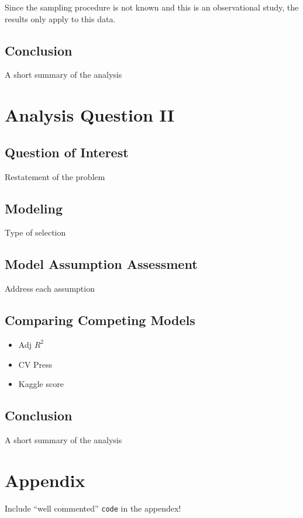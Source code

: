 \documentclass[american,]{article}
\providecommand{\tightlist}{%
  \setlength{\itemsep}{0pt}\setlength{\parskip}{0pt}}
\begin{document}
Since the sampling procedure is not known and this is an observational
study, the results only apply to this data.

\hypertarget{conclusion}{%
\subsection{Conclusion}\label{conclusion}}

A short summary of the analysis

\hypertarget{analysis-question-ii}{%
\section{Analysis Question II}\label{analysis-question-ii}}

\hypertarget{question-of-interest-1}{%
\subsection{Question of Interest}\label{question-of-interest-1}}

Restatement of the problem

\hypertarget{modeling-1}{%
\subsection{Modeling}\label{modeling-1}}

Type of selection

\hypertarget{model-assumption-assessment}{%
\subsection{Model Assumption
Assessment}\label{model-assumption-assessment}}

Address each assumption

\hypertarget{comparing-competing-models-1}{%
\subsection{Comparing Competing
Models}\label{comparing-competing-models-1}}

\begin{itemize}
\tightlist
\item
  Adj \(R^2\)
\item
  CV Press
\item
  Kaggle score
\end{itemize}

\hypertarget{conclusion-1}{%
\subsection{Conclusion}\label{conclusion-1}}

A short summary of the analysis

\hypertarget{appendix}{%
\section{Appendix}\label{appendix}}

Include ``well commented'' \texttt{code} in the appendex!

\renewcommand\refname{References}

\end{document}
